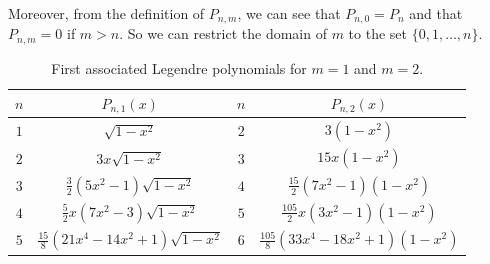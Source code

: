 \documentclass[../main.tex]{subfiles}
\begin{document}
Moreover, from the definition of $P_{n,m}$, we can see that $P_{n,0}=P_n$ and that $P_{n,m}=0$ if $m>n$. So we can restrict the domain of $m$ to the set $\{0,1,\dots,n\}$.

\begin{table}[ht]
  \centering
  \captionsetup{type=table} %
  \begin{tabular}{|c|c||c|c|}
    \hline
    $n$ & $P_{n,1}(x)$                              & $n$ & $P_{n,2}(x)$                          \\
    \hline
    $1$ & $\sqrt{1-x^2}$                            & $2$ & $3(1-x^2)$                            \\
    $2$ & $3x\sqrt{1-x^2}$                          & $3$ & $15x(1-x^2)$                          \\
    $3$ & $\frac{3}{2}(5 x^2-1)\sqrt{1-x^2}$        & $4$ & $\frac{15}{2}(7x^2-1)(1-x^2)$         \\
    $4$ & $\frac{5}{2}x(7x^2-3)\sqrt{1-x^2}$        & $5$ & $\frac{105}{2}x(3x^2-1)(1-x^2)$       \\
    $5$ & $\frac{15}{8}(21x^4-14x^2+1)\sqrt{1-x^2}$ & $6$ & $\frac{105}{8}(33x^4-18x^2+1)(1-x^2)$ \\
    \hline
  \end{tabular}
  \caption{First associated Legendre polynomials for $m=1$ and $m=2$.}
\end{table}
\end{document}

